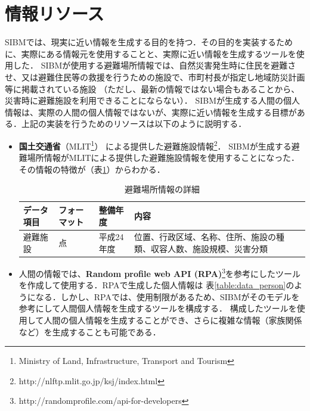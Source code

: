 \section{情報リソース}
\label{sibm:resource}

SIBMでは、現実に近い情報を生成する目的を持つ．その目的を実装するために、実際にある情報元を使用することと、実際に近い情報を生成するツールを使用した．
SIBMが使用する避難場所情報では、自然災害発生時に住民を避難させ、又は避難住民等の救援を行うための施設で、市町村長が指定し地域防災計画等に掲載されている施設
（ただし、最新の情報ではない場合もあることから、災害時に避難施設を利用できることにならない）．
SIBMが生成する人間の個人情報は、実際の人間の個人情報ではないが、実際に近い情報を生成する目標がある．上記の実装を行うためのリソースは以下のように説明する．

\begin{itemize}
	\item
	\textbf{国土交通省}（MLIT\footnote{Ministry of Land, Infrastructure, Transport and
	Tourism}） による提供した避難施設情報\footnote{http://nlftp.mlit.go.jp/ksj/index.html}．
	SIBMが生成する避難場所情報がMLITによる提供した避難施設情報を使用することになった．その情報の特徴が（表\ref{table:data_shelter}）からわかる．
	
	\begin{table}[h]
	\begin{center}
	\begin{tabular}{| l | l | l | p{48mm} |}
		\hline
		\rowstyle{\bfseries}
		データ項目 & フォーマット & 整備年度 & 内容 \\
		\hline
		避難施設 & 点 & 平成24年度 & 位置、行政区域、名称、住所、施設の種類、収容人数、施設規模、災害分類 \\
		\hline
	\end{tabular}
	\caption{避難場所情報の詳細}
	\label{table:data_shelter}
	\end{center}
	\end{table}

	\item 人間の情報では、\textbf{Random profile web
	API
	(RPA)}\footnote{http://randomprofile.com/api-for-developers}を参考にしたツールを作成して使用する．RPAで生成した個人情報は
	表\ref{table:data_person}のようになる．しかし、RPAでは、使用制限があるため、SIBMがそのモデルを参考にして人間個人情報を生成するツールを構成する．
	構成したツールを使用して人間の個人情報を生成することができ、さらに複雑な情報（家族関係など）を生成することも可能である．
	

\end{itemize}
